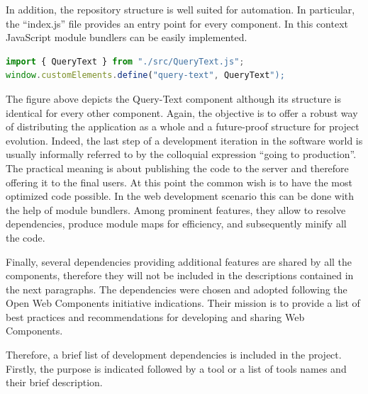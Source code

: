 In addition, the repository structure is well suited for automation. In particular, the “index.js” file provides an entry point for every component. In this context JavaScript module bundlers can be easily implemented.
\\
\begin{lstlisting}[caption={Component entry point example},label={componentEntrypoint}, language=JavaScript]
import { QueryText } from "./src/QueryText.js";
window.customElements.define("query-text", QueryText");
\end{lstlisting}

The figure above depicts the Query-Text component although its structure is identical for every other component. Again, the objective is to offer a robust way of distributing the application as a whole and a future-proof structure for project evolution. Indeed, the last step of a development iteration in the software world is usually informally referred to by the colloquial expression “going to production”. The practical meaning is about publishing the code to the server and therefore offering it to the final users. At this point the common wish is to have the most optimized code possible. In the web development scenario this can be done with the help of module bundlers. Among prominent features, they allow to resolve dependencies, produce module maps for efficiency, and subsequently minify all the code.

Finally, several dependencies providing additional features are shared by all the components, therefore they will not be included in the descriptions contained in the next paragraphs. The dependencies were chosen and adopted following the Open Web Components initiative indications. Their mission is to provide a list of best practices and recommendations for developing and sharing Web Components.

Therefore, a brief list of development dependencies is included in the project. Firstly, the purpose is indicated followed by a tool or a list of tools names and their brief description.

